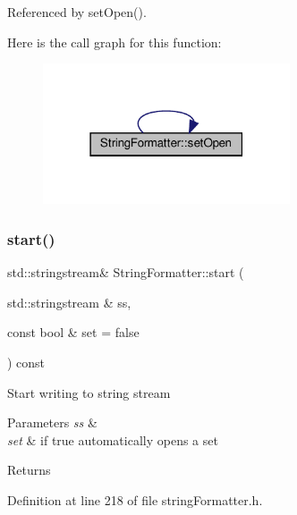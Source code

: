 Referenced by set\+Open().

Here is the call graph for this function\+:
\nopagebreak
\begin{figure}[H]
\begin{center}
\leavevmode
\includegraphics[width=207pt]{classStringFormatter_ad477eddfe41eb425ddd1b13051d838b9_cgraph}
\end{center}
\end{figure}
\mbox{\label{classStringFormatter_abfaada84b0472d0a41dcd5a56e534808}} 
\subsubsection{\texorpdfstring{start()}{start()}\hspace{0.1cm}{\footnotesize\ttfamily [1/2]}}
{\footnotesize\ttfamily std\+::stringstream\& String\+Formatter\+::start (\begin{DoxyParamCaption}\item[{std\+::stringstream \&}]{ss,  }\item[{const bool \&}]{set = {\ttfamily false} }\end{DoxyParamCaption}) const\hspace{0.3cm}{\ttfamily [inline]}}

Start writing to string stream


\begin{DoxyParams}{Parameters}
{\em ss} & \\
\hline
{\em set} & if true automatically opens a set \\
\hline
\end{DoxyParams}
\begin{DoxyReturn}{Returns}

\end{DoxyReturn}


Definition at line 218 of file string\+Formatter.\+h.



